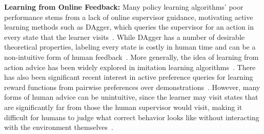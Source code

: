\textbf{Learning from Online Feedback: }
Many policy learning algorithms' poor performance stems from a lack of online supervisor guidance, motivating active learning methods such as DAgger, which queries the supervisor for an action in every state that the learner visits~\cite{dagger}. While DAgger has a number of desirable theoretical properties, labeling every state is costly in human time and can be a non-intuitive form of human feedback~\cite{DART}. More generally, the idea of learning from action advice has been widely explored in imitation learning algorithms~\cite{converging-supervisors,SHIV,judah2011active,jauhri2020interactive}.
There has also been significant recent interest in active preference queries for learning reward functions from pairwise preferences over demonstrations~\cite{sadigh2017active,christiano2017deep,ibarz2018reward,palan2019learning,biyik2019asking,brown2020safe}. However, many forms of human advice can be unintuitive, since the learner may visit states that are significantly far from those the human supervisor would visit, making it difficult for humans to judge what correct behavior looks like without interacting with the environment themselves~\cite{EIL,reddy2018shared}.

